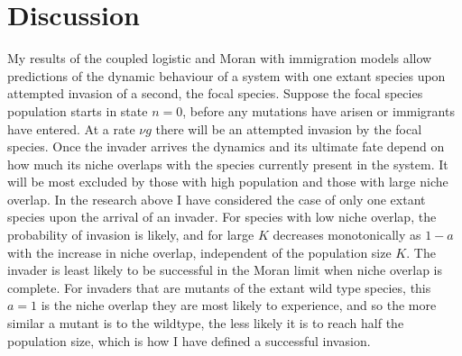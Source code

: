 \section{Discussion}

\iffalse
In the research presented above, even though not all species are equal to each other, their interactions have been symmetric. %
That is, no species has been given an explicit fitness advantage. 
The complete neutrality of Hubbell comes when the species not only interact with each other symmetrically but also interact with other species as strongly as they interact with themselves. 
\fi
\iffalse
My results of the coupled logistic and Moran with immigration models allow predictions of the dynamic behaviour of a system with one extant species upon attempted invasion of a second, the focal species. 
Suppose the focal species population starts in state $n=0$, before any mutations have arisen or immigrants have entered.  
At a rate $\nu g$ there will be an attempted invasion by the focal species. 
Once the invader arrives the dynamics and its ultimate fate depend on how much its niche overlaps with the species currently present in the system. 
It will be most excluded by those with high population and those with large niche overlap. 
In the research above I have considered the case of only one extant species upon the arrival of an invader. 
For species with low niche overlap, the probability of invasion is likely, and for large $K$ decreases monotonically as $1-a$ with the increase in niche overlap, independent of the population size $K$. %
The invader is least likely to be successful in the Moran limit when niche overlap is complete. 
For invaders that are mutants of the extant wild type species, this $a=1$ is the niche overlap they are most likely to experience, and so the more similar a mutant is to the wildtype, the less likely it is to reach half the population size, which is how I have defined a successful invasion. 

